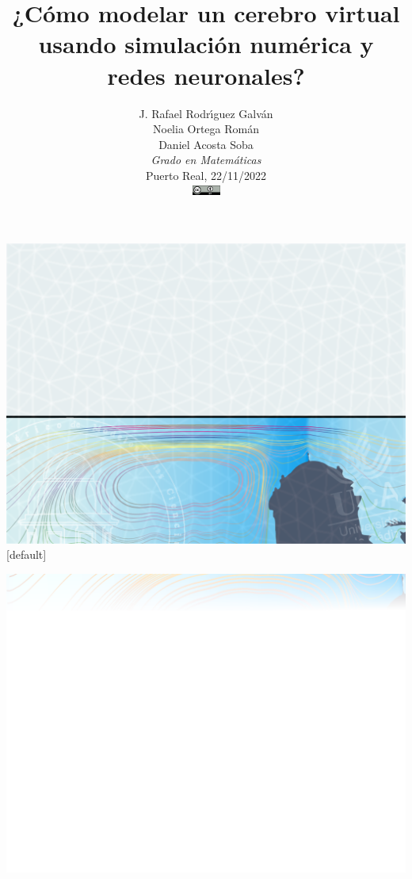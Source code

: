 \documentclass[
  unknownkeysallowed %
]{beamer}
\title[Cerebro virtual]
{¿Cómo modelar un cerebro virtual usando simulación numérica y redes neuronales?\vspace*{-0.5cm}}
\author[JRR, NOR, DAS]{%
  {J. Rafael Rodr\'{\i}guez Galv\'an\\
  Noelia Ortega Román\\
  Daniel Acosta Soba}
  \\[0.2em]
  {\small \em Grado en Matemáticas}
  \\[0.2em]
  {\scriptsize Puerto Real, 22/11/2022}
  \\[1em]
  \includegraphics[width=2.5em]{img/cc-by}
}
\date{}
\begin{document}

%
%
 {\includegraphics[width=\paperwidth,height=\paperheight]{frontpage_bg}}
[default]

\begin{frame}
  \titlepage
  \vspace{2.5cm}
\end{frame}

%
%

 {\includegraphics[width=\paperwidth,height=\paperheight]{slide_bg}}
\end{document}
